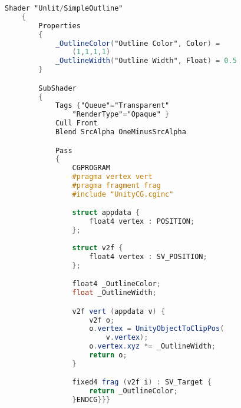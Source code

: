 \label{ap:codigo-fonte-contorno-hlsl}



	\begin{lstlisting}[language=GLSL, caption={\label{cf:outlineHLSL} Transcrição do \textit{shader} de contorno de GLSL para HLSL}]
	Shader "Unlit/SimpleOutline" 
	{
		Properties 
		{
			_OutlineColor("Outline Color", Color) = 
				(1,1,1,1)
			_OutlineWidth("Outline Width", Float) = 0.5
		}

		SubShader 
		{
			Tags {"Queue"="Transparent" 
				"RenderType"="Opaque" }
			Cull Front
			Blend SrcAlpha OneMinusSrcAlpha

			Pass 
			{
				CGPROGRAM
				#pragma vertex vert
				#pragma fragment frag
				#include "UnityCG.cginc"

				struct appdata {
					float4 vertex : POSITION;
				};
				
				struct v2f {
					float4 vertex : SV_POSITION;
				};

				float4 _OutlineColor;
				float _OutlineWidth;

				v2f vert (appdata v) {
					v2f o;
					o.vertex = UnityObjectToClipPos(
						v.vertex);
					o.vertex.xyz *= _OutlineWidth;
					return o;
				}

				fixed4 frag (v2f i) : SV_Target {
					return _OutlineColor;
				}ENDCG}}}
\end{lstlisting}
